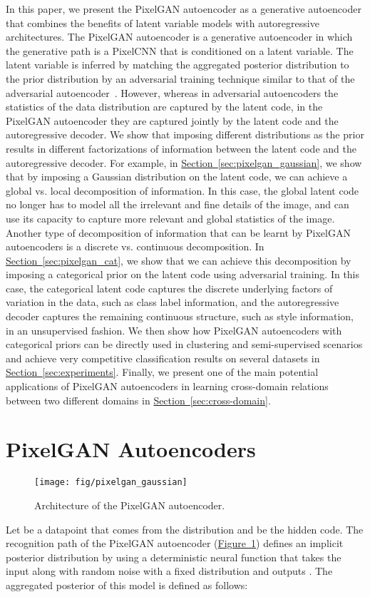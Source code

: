 \documentclass{article}
\newcommand{\mysec}[1]{\hyperref[sec:#1]{Section~\ref*{sec:#1}}}
\newcommand{\myfig}[1]{\hyperref[fig:#1]{Figure~\ref*{fig:#1}}}
\begin{document}
In this paper, we present the PixelGAN autoencoder as a generative autoencoder that combines the benefits of latent variable models with autoregressive architectures. The PixelGAN autoencoder is a generative autoencoder in which the generative path is a PixelCNN that is conditioned on a latent variable. The latent variable is inferred by matching the aggregated posterior distribution to the prior distribution by an adversarial training technique similar to that of the adversarial autoencoder~\citep{aae}. However, whereas in adversarial autoencoders the statistics of the data distribution are captured by the latent code, in the PixelGAN autoencoder they are captured jointly by the latent code and the autoregressive decoder.
We show that imposing different distributions as the prior results in different factorizations of information between the latent code and the autoregressive decoder. For example, in \mysec{pixelgan_gaussian}, we show that by imposing a Gaussian distribution on the latent code, we can achieve a global vs. local decomposition of information. In this case, the global latent code no longer has to model all the irrelevant and fine details of the image, and can use its capacity to capture more relevant and global statistics of the image.
Another type of decomposition of information that can be learnt by PixelGAN autoencoders is a discrete vs. continuous decomposition. In \mysec{pixelgan_cat}, we show that we can achieve this decomposition by imposing a categorical prior on the latent code using adversarial training. In this case, the categorical latent code captures the discrete underlying factors of variation in the data, such as class label information, and the autoregressive decoder captures the remaining continuous structure, such as style information, in an unsupervised fashion.
We then show how PixelGAN autoencoders with categorical priors can be directly used in clustering and semi-supervised scenarios and achieve very competitive classification results on several datasets in \mysec{experiments}.
Finally, we present one of the main potential applications of PixelGAN autoencoders in learning cross-domain relations between two different domains in \mysec{cross-domain}.


\section{PixelGAN Autoencoders}\label{sec:pixelgan}

\begin{figure}[t]
\begin{center}
\texttt{[image: fig/pixelgan\_gaussian]}
\end{center}
\vspace{-.3cm}
\caption{\label{fig:pixelgan_gaussian}Architecture of the PixelGAN autoencoder.}
\end{figure}
Let  be a datapoint that comes from the distribution  and  be the hidden code. The recognition path of the PixelGAN autoencoder (\myfig{pixelgan_gaussian}) defines an implicit posterior distribution  by using a deterministic neural function  that takes the input  along with random noise  with a fixed distribution  and outputs . The aggregated posterior  of this model is defined as follows:
\end{document}
